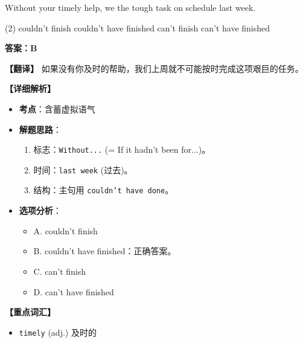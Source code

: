 \documentclass[11pt, a4paper]{article}
\newcommand{\analysis}[4]{
    \begin{solutionbox}
        \textbf{答案：#1}
        
        \textbf{【翻译】} #2
        
        \textbf{【详细解析】}
        #3
        
        \textbf{【重点词汇】}
        #4
    \end{solutionbox}
}
\newcommand{\blank}{\underline{\hspace{1.5cm}}}
\begin{document}
\begin{questions}
    \item Without your timely help, we \blank the tough task on schedule last week.
    \begin{tasks}(2)
        \task couldn’t finish \task couldn’t have finished
        \task can’t finish \task can’t have finished
    \end{tasks}
    \analysis{B}{如果没有你及时的帮助，我们上周就不可能按时完成这项艰巨的任务。}{
        \begin{itemize}
            \item \textbf{考点}：含蓄虚拟语气
            \item \textbf{解题思路}：
                \begin{enumerate}
                    \item 标志：\texttt{Without...} (= If it hadn't been for...)。
                    \item 时间：\texttt{last week} (过去)。
                    \item 结构：主句用 \texttt{couldn't have done}。
                \end{enumerate}
            \item \textbf{选项分析}：
                \begin{itemize}
                    \item A. couldn’t finish
                    \item B. couldn’t have finished：正确答案。
                    \item C. can’t finish
                    \item D. can’t have finished
                \end{itemize}
        \end{itemize}
    }{
        \begin{itemize}
            \item \texttt{timely} (adj.) 及时的
        \end{itemize}
    }


\end{questions}
\end{document}
